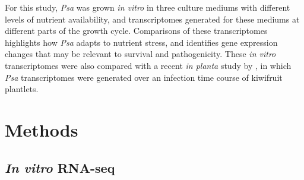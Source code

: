 For this study, \textit{Psa} was grown \textit{in vitro} in three culture mediums with different levels of nutrient availability, and transcriptomes generated for these mediums at different parts of the growth cycle. Comparisons of these transcriptomes highlights how \textit{Psa} adapts to nutrient stress, and identifies gene expression changes that may be relevant to survival and pathogenicity. These \textit{in vitro} transcriptomes were also compared with a recent \textit{in planta} study by \cite{McAtee2018-sl}, in which \textit{Psa} transcriptomes were generated over an infection time course of kiwifruit plantlets. 

\section{Methods}
\subsection{\textit{In vitro} RNA-seq}


